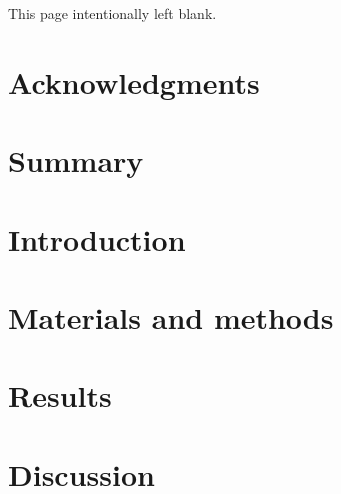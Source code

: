 \documentclass[a4paper, oneside, 12pt]{report}
\begin{document}



\vspace*{\fill}
\hfill
\begin{center}
This page intentionally left blank.
\end{center}
\vspace{\fill}
\null\newpage

\chapter*{Acknowledgments}
\clearpage

\tableofcontents

\listoffigures

\listoftables

\glsunsetall
\renewcommand*{\glossarypreamble}{\vspace*{-2em}}

\setcounter{secnumdepth}{-2}
\vspace*{-2em}
\chapter{Summary}
\thispagestyle{fancy}

\setcounter{secnumdepth}{2}

\clearpage

\chapter{Introduction}
\thispagestyle{fancy}


\chapter{Materials and methods}
\thispagestyle{fancy}


\chapter{Results}
\thispagestyle{fancy}


\chapter{Discussion}
\thispagestyle{fancy}

\end{document}
